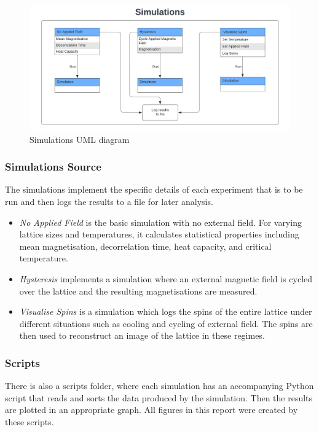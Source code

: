 \documentclass[a4paper, 12pt]{article}
\begin{document}
\begin{figure}[H]
\centering
\includegraphics[width=\textwidth]{./resources/sim_UML_diagram.png}
\caption{Simulations UML diagram}
\end{figure}
	

	\subsubsection{Simulations Source}
	The simulations implement the specific details of each experiment that is to be run and then logs the results to a file for later analysis. 
	\begin{itemize}
		\item {\it No Applied Field} is the basic simulation with no external field. For varying lattice sizes and temperatures, it calculates statistical properties including mean magnetisation, decorrelation time, heat capacity, and critical temperature.

		\item {\it Hysteresis} implements a simulation where an external magnetic field is cycled over the lattice and the resulting magnetisations are measured. 

		\item {\it Visualise Spins} is a simulation which logs the spins of the entire lattice under different situations such as cooling and cycling of external field. The spins are then used to reconstruct an image of the lattice in these regimes.
	\end{itemize}

	\subsubsection{Scripts}
	There is also a scripts folder, where each simulation has an accompanying Python script that reads and sorts the data produced by the simulation. Then the results are plotted in an appropriate graph. All figures in this report were created by these scripts.
\end{document}
